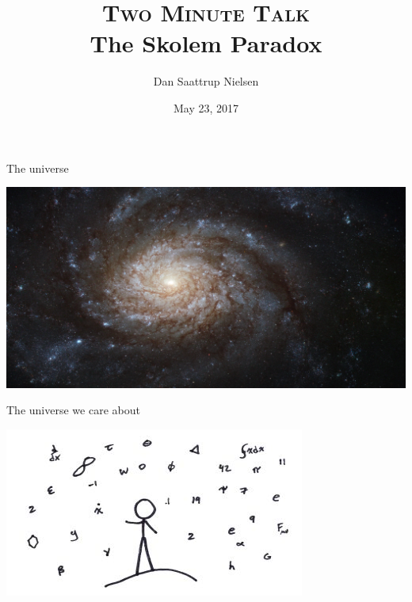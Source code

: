 

\title{{\scshape\small Two Minute Talk}\\ The Skolem Paradox}
\author{Dan Saattrup Nielsen}
\date{\small May 23, 2017}



{

\begin{frame}
  \maketitle
\end{frame}}

\begin{frame}{The universe}
  \begin{center}
    \includegraphics[scale=0.08]{gfx/universe.jpg}
  \end{center}
\end{frame}

\begin{frame}{The universe we care about}
  \begin{center}
    \includegraphics[scale=1.5]{gfx/maths_universe.jpeg}
  \end{center}
\end{frame}



